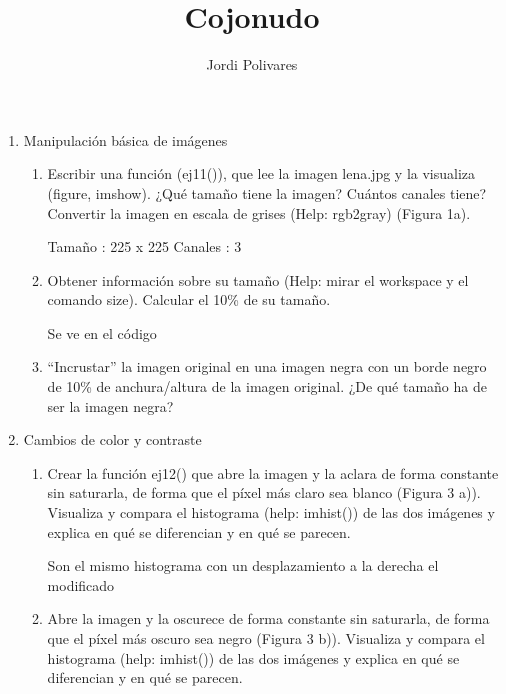 \documentclass[a4paper,10pt]{article}
\title{Cojonudo}
\author{Jordi Polivares}
\begin{document}
\maketitle
 
\begin{enumerate}
 
 \item Manipulación básica de imágenes
 
 \begin{enumerate}
 
  \item Escribir una  función (ej11()), que lee la imagen lena.jpg y la visualiza (figure, 
imshow).  ¿Qué  tamaño  tiene  la  imagen?  Cuántos  canales tiene? Convertir la 
imagen en escala de grises (Help: rgb2gray) (Figura 1a). 
 
 Tamaño : 225 x 225
 Canales : 3
 
 
 \item Obtener información sobre su tamaño (Help: mirar el workspace y el comando 
size).  Calcular el 10\% de su tamaño.
 
 Se ve en el código
 
 \item “Incrustar”  la  imagen original  en una  imagen  negra con  un  borde  negro  de 
10\%  de  anchura/altura  de  la  imagen  original.  ¿De  qué  tamaño  ha  de  ser  la 
imagen negra?

 
 \end{enumerate}

 \item Cambios de color y contraste
 
 \begin{enumerate}
  \item Crear la función ej12() que abre la imagen y la aclara
de  forma  constante  sin  saturarla,  de  forma  que  el  píxel  más  claro  sea 
blanco (Figura 3 a)). Visualiza y 
compara el histograma  (help: imhist()) de las dos imágenes  y explica en 
qué se diferencian y en qué se parecen.

  Son el mismo histograma con un desplazamiento a la derecha el modificado

  \item Abre la imagen y la oscurece de  forma constante sin 
saturarla,  de  forma  que  el  píxel  más  oscuro  sea  negro  (Figura  3  b)). Visualiza y compara el histograma 
(help: imhist()) de las dos imágenes y explica en qué se diferencian y en 
qué se parecen.


\end{enumerate}
\end{enumerate}
\end{document}
